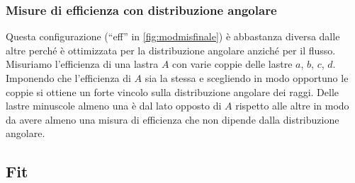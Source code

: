 \subsubsection{Misure di efficienza con distribuzione angolare}

Questa configurazione (``eff'' in \autoref{fig:modmisfinale})
è abbastanza diversa dalle altre perché è ottimizzata per la distribuzione angolare anziché per il flusso.
Misuriamo l'efficienza di una lastra $A$ con varie coppie delle lastre $a$, $b$, $c$, $d$.
Imponendo che l'efficienza di $A$ sia la stessa e scegliendo in modo opportuno le coppie
si ottiene un forte vincolo sulla distribuzione angolare dei raggi.
Delle lastre minuscole almeno una è dal lato opposto di $A$ rispetto alle altre in modo
da avere almeno una misura di efficienza che non dipende dalla distribuzione angolare.

\subsection{Fit}




